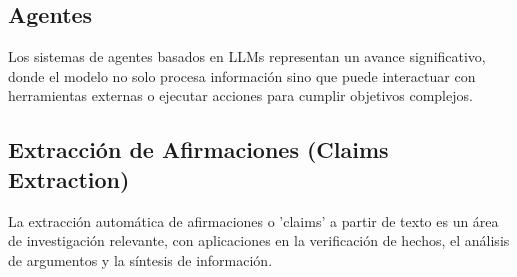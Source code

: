 \subsection{Agentes}\label{sec:agents}
Los sistemas de agentes basados en LLMs representan un avance significativo, donde el modelo no solo procesa información sino que puede interactuar con herramientas externas o ejecutar acciones para cumplir objetivos complejos. %

\subsection{Extracción de Afirmaciones (Claims Extraction)}\label{sec:claims_extraction}
La extracción automática de afirmaciones o 'claims' a partir de texto es un área de investigación relevante, con aplicaciones en la verificación de hechos, el análisis de argumentos y la síntesis de información. %